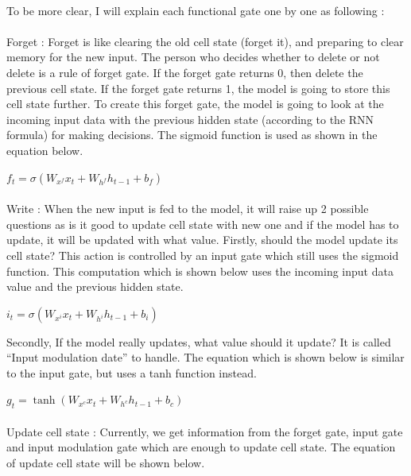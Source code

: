\paragraph{}
To be more clear, I will explain each functional gate one by one as following :

\paragraph{}
Forget : Forget is like clearing the old cell state (forget it), and preparing to clear memory for the new input. The person who decides whether to delete or not delete is a rule of forget gate. If the forget gate returns 0, then delete the previous cell state. If the forget gate returns 1, the model is going to store this cell state further. To create this forget gate, the model is going to look at the incoming input data with the previous hidden state (according to the RNN formula) for making decisions. The sigmoid function is used as shown in the equation below.

\hfil $ f_t = \sigma(W_{x^f}x_t + W_{h^f}h_{t-1} + b_f) $ \par 

  \paragraph{}
Write : When the new input is fed to the model, it will raise up 2 possible questions as is it good to update cell state with new one and if the model has to update, it will be updated with what value. Firstly, should the model update its cell state? This action is controlled by an input gate which still uses the sigmoid function. This computation which is shown below uses the incoming input data value and the previous hidden state.

\hfil $ i_t = \sigma(W_{x^i}x_t + W_{h^i}h_{t-1} + b_i) $ \par
Secondly, If the model really updates, what value should it update? It is called “Input modulation date” to handle. The equation which is shown below is similar to the input gate, but uses a tanh function instead.

\hfil $ g_t = \tanh(W_{x^c}x_t + W_{h^c}h_{t-1} + b_c) $ \par 

\paragraph{}
Update cell state : Currently, we get information from the forget gate, input gate and input modulation gate which are enough to update cell state. The equation of update cell state will be shown below.


